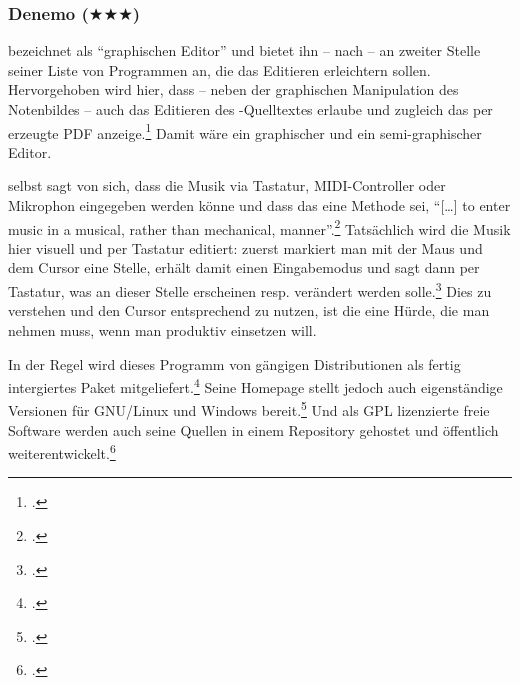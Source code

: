 %
%
%



\subsubsection{Denemo ($\bigstar\bigstar\bigstar$)}

\label{Denemo} bezeichnet  als \enquote{graphischen
Editor} und bietet ihn -- nach  -- an zweiter Stelle seiner
Liste von Programmen an, die das Editieren erleichtern sollen. Hervorgehoben
wird hier, dass  -- neben der graphischen Manipulation des
Notenbildes -- auch das Editieren des -Quelltextes erlaube und
zugleich das per  erzeugte PDF anzeige.\footcite[vgl.][\nopage
wp]{LilyPond2018g} Damit wäre  ein graphischer und ein
semi-graphischer Editor.

 selbst sagt von sich, dass die Musik via Tastatur, MIDI-Controller
oder Mikrophon eingegeben werden könne und dass das eine Methode sei,
\enquote{[\ldots] to enter music in a musical, rather than mechanical,
manner}.\footcite[vgl.][\nopage wp]{Denemo2019b} Tatsächlich wird die Musik hier
visuell und per Tastatur editiert: zuerst markiert man mit der Maus und dem
Cursor eine Stelle, erhält damit einen Eingabemodus und sagt dann per Tastatur,
was an dieser Stelle erscheinen resp. verändert werden solle.\footcite[vgl.][1,
5, u. 47ff]{Shann2015b} Dies zu verstehen und den Cursor entsprechend zu nutzen,
ist die eine Hürde, die man nehmen muss, wenn man  produktiv
einsetzen will.

In der Regel wird dieses Programm von gängigen Distributionen als fertig
intergiertes Paket mitgeliefert.\footcite[vgl. z.B.][\nopage
wp]{UbuntuDenemo2014a} Seine Homepage stellt jedoch auch eigenständige
Versionen für GNU/Linux und Windows bereit.\footcite[vgl.][\nopage
wp]{Denemo2019d} Und als GPL lizenzierte freie Software werden auch seine
Quellen in einem Repository gehostet und öffentlich
weiterentwickelt.\footcite[vgl.][\nopage wp]{GithubDenemo2019a}

